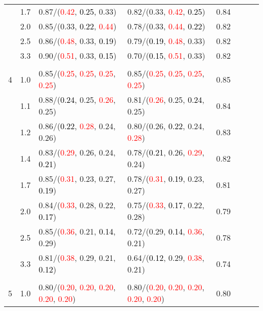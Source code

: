 \documentclass[10pt,a4paper]{report}
\begin{document}
\begin{table}[!htbp]
\begin{center}
{\begin{tabular}{ccllcccc}
			&1.7&0.87/(\textcolor{red}{0.42}, \textcolor{black}{0.25}, 0.33)&0.82/(0.33, \textcolor{red}{0.42}, \textcolor{black}{0.25})&0.84\\
			&2.0&0.85/(0.33, \textcolor{black}{0.22}, \textcolor{red}{0.44})&0.78/(0.33, \textcolor{red}{0.44}, \textcolor{black}{0.22})&0.82\\
			&2.5&0.86/(\textcolor{red}{0.48}, 0.33, \textcolor{black}{0.19})&0.79/(\textcolor{black}{0.19}, \textcolor{red}{0.48}, 0.33)&0.82\\
			&3.3&0.90/(\textcolor{red}{0.51}, 0.33, \textcolor{black}{0.15})&0.70/(\textcolor{black}{0.15}, \textcolor{red}{0.51}, 0.33)&0.82\\
			&&&&\\
			4			&1.0&0.85/(\textcolor{red}{0.25}, \textcolor{red}{0.25}, \textcolor{red}{0.25}, \textcolor{red}{0.25})&0.85/(\textcolor{red}{0.25}, \textcolor{red}{0.25}, \textcolor{red}{0.25}, \textcolor{red}{0.25})&0.85\\
			&1.1&0.88/(\textcolor{black}{0.24}, 0.25, \textcolor{red}{0.26}, 0.25)&0.81/(\textcolor{red}{0.26}, 0.25, \textcolor{black}{0.24}, 0.25)&0.84\\
			&1.2&0.86/(\textcolor{black}{0.22}, \textcolor{red}{0.28}, 0.24, 0.26)&0.80/(0.26, \textcolor{black}{0.22}, 0.24, \textcolor{red}{0.28})&0.83\\
			&1.4&0.83/(\textcolor{red}{0.29}, 0.26, 0.24, \textcolor{black}{0.21})&0.78/(\textcolor{black}{0.21}, 0.26, \textcolor{red}{0.29}, 0.24)&0.82\\
			&1.7&0.85/(\textcolor{red}{0.31}, 0.23, 0.27, \textcolor{black}{0.19})&0.78/(\textcolor{red}{0.31}, \textcolor{black}{0.19}, 0.23, 0.27)&0.81\\
			&2.0&0.84/(\textcolor{red}{0.33}, 0.28, 0.22, \textcolor{black}{0.17})&0.75/(\textcolor{red}{0.33}, \textcolor{black}{0.17}, 0.22, 0.28)&0.79\\
			&2.5&0.85/(\textcolor{red}{0.36}, 0.21, \textcolor{black}{0.14}, 0.29)&0.72/(0.29, \textcolor{black}{0.14}, \textcolor{red}{0.36}, 0.21)&0.78\\
			&3.3&0.81/(\textcolor{red}{0.38}, 0.29, 0.21, \textcolor{black}{0.12})&0.64/(\textcolor{black}{0.12}, 0.29, \textcolor{red}{0.38}, 0.21)&0.74\\
			&&&&\\
			5			&1.0&0.80/(\textcolor{red}{0.20}, \textcolor{red}{0.20}, \textcolor{red}{0.20}, \textcolor{red}{0.20}, \textcolor{red}{0.20})&0.80/(\textcolor{red}{0.20}, \textcolor{red}{0.20}, \textcolor{red}{0.20}, \textcolor{red}{0.20}, \textcolor{red}{0.20})&0.80\\

\end{tabular}}
\end{center}
\end{table}
\end{document}
